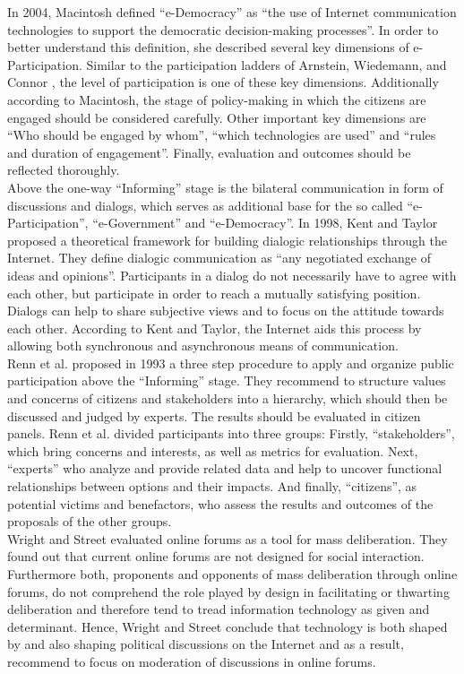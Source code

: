 In 2004, Macintosh \cite{Macintosh2004_eParticipation_characterization} defined ``e-Democracy'' as ``the use of Internet communication technologies to support the democratic decision-making processes''. In order to better understand this definition, she described several key dimensions of e-Participation. Similar to the participation ladders of Arnstein, Wiedemann, and Connor \cite{Arnstein1969_citizen_participation,Wiedemann1993355,Connor1988_new_ladder}, the level of participation is one of these key dimensions. Additionally according to Macintosh, the stage of policy-making in which the citizens are engaged should be considered carefully. Other important key dimensions are ``Who should be engaged by whom'', ``which technologies are used'' and ``rules and duration of engagement''. Finally, evaluation and outcomes should be reflected thoroughly.\\
Above the one-way ``Informing'' stage is the bilateral communication in form of discussions and dialogs, which serves as additional base for the so called ``e-Participation'', ``e-Government'' and ``e-Democracy''. In 1998, Kent and Taylor \cite{Kent1998_dialogic_relationships_through_www} proposed a theoretical framework for building dialogic relationships through the Internet. They define dialogic communication as ``any negotiated exchange of ideas and opinions''. Participants in a dialog do not necessarily have to agree with each other, but participate in order to reach a mutually satisfying position. Dialogs can help to share subjective views and to focus on the attitude towards each other. According to Kent and Taylor, the Internet aids this process by allowing both synchronous and asynchronous means of communication.\\
Renn et al. \cite{Renn1993_participation} proposed in 1993 a three step procedure to apply and organize public participation above the ``Informing'' stage. They recommend to structure values and concerns of citizens and stakeholders into a hierarchy, which should then be discussed and judged by experts. The results should be evaluated in citizen panels. Renn et al. divided participants into three groups: Firstly, ``stakeholders'', which bring concerns and interests, as well as metrics for evaluation. Next, ``experts'' who analyze and provide related data and help to uncover functional relationships between options and their impacts. And finally, ``citizens'', as potential victims and benefactors, who assess the results and outcomes of the proposals of the other groups.\\
Wright and Street \cite{Wright2007_deliberation_design} evaluated online forums as a tool for mass deliberation. They found out that current online forums are not designed for social interaction. Furthermore both, proponents and opponents of mass deliberation through online forums, do not comprehend the role played by design in facilitating or thwarting deliberation and therefore tend to tread information technology as given and determinant. Hence, Wright and Street conclude that technology is both shaped by and also shaping political discussions on the Internet and as a result, recommend to focus on moderation of discussions in online forums.\\
